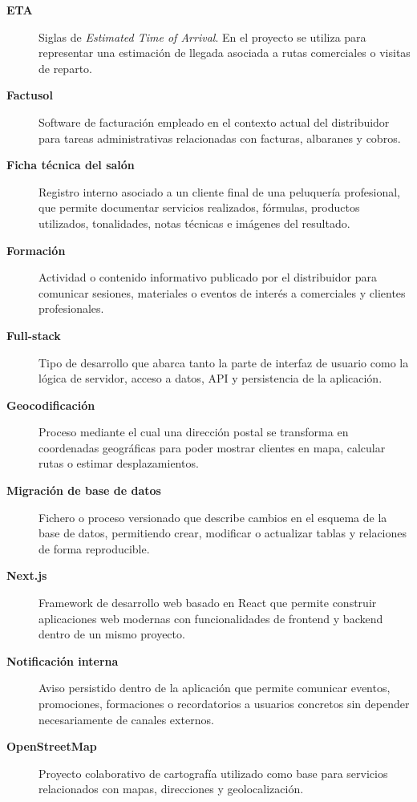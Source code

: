 \begin{description}
\item[\textbf{ETA}]
Siglas de \textit{Estimated Time of Arrival}. En el proyecto se utiliza para representar una estimación de llegada asociada a rutas comerciales o visitas de reparto.

\item[\textbf{Factusol}]
Software de facturación empleado en el contexto actual del distribuidor para tareas administrativas relacionadas con facturas, albaranes y cobros.

\item[\textbf{Ficha técnica del salón}]
Registro interno asociado a un cliente final de una peluquería profesional, que permite documentar servicios realizados, fórmulas, productos utilizados, tonalidades, notas técnicas e imágenes del resultado.

\item[\textbf{Formación}]
Actividad o contenido informativo publicado por el distribuidor para comunicar sesiones, materiales o eventos de interés a comerciales y clientes profesionales.

\item[\textbf{Full-stack}]
Tipo de desarrollo que abarca tanto la parte de interfaz de usuario como la lógica de servidor, acceso a datos, API y persistencia de la aplicación.

\item[\textbf{Geocodificación}]
Proceso mediante el cual una dirección postal se transforma en coordenadas geográficas para poder mostrar clientes en mapa, calcular rutas o estimar desplazamientos.

\item[\textbf{Migración de base de datos}]
Fichero o proceso versionado que describe cambios en el esquema de la base de datos, permitiendo crear, modificar o actualizar tablas y relaciones de forma reproducible.

\item[\textbf{Next.js}]
Framework de desarrollo web basado en React que permite construir aplicaciones web modernas con funcionalidades de frontend y backend dentro de un mismo proyecto.

\item[\textbf{Notificación interna}]
Aviso persistido dentro de la aplicación que permite comunicar eventos, promociones, formaciones o recordatorios a usuarios concretos sin depender necesariamente de canales externos.

\item[\textbf{OpenStreetMap}]
Proyecto colaborativo de cartografía utilizado como base para servicios relacionados con mapas, direcciones y geolocalización.


\end{description}
